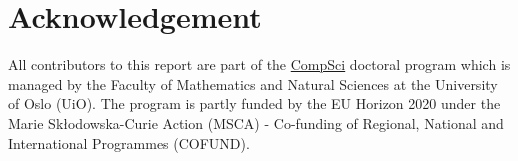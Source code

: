 \section{Acknowledgement} \label{subsec:acknowledgement}
All contributors to this report are part of the \href{https://www.mn.uio.no/compsci/english/}{CompSci} doctoral program which is managed by the Faculty of Mathematics and Natural Sciences at the University of Oslo (UiO).
The program is partly funded by the EU Horizon 2020 under the Marie Skłodowska-Curie Action (MSCA) - Co-funding of Regional, National and International Programmes (COFUND).